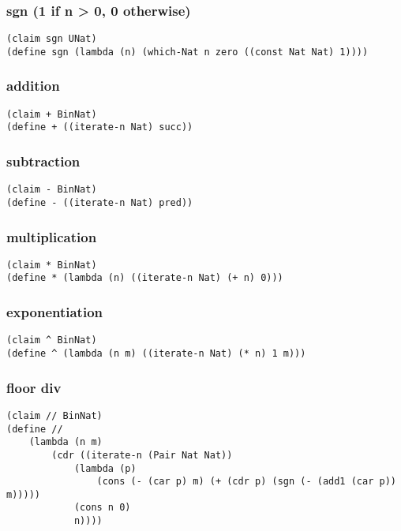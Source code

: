 \subsubsection{sgn (1 if n > 0, 0 otherwise)}
\begin{verbatim}
(claim sgn UNat)
(define sgn (lambda (n) (which-Nat n zero ((const Nat Nat) 1))))
\end{verbatim}

\subsubsection{addition}
\begin{verbatim}
(claim + BinNat)
(define + ((iterate-n Nat) succ))
\end{verbatim}

\subsubsection{subtraction}
\begin{verbatim}
(claim - BinNat)
(define - ((iterate-n Nat) pred))
\end{verbatim}

\subsubsection{multiplication}
\begin{verbatim}
(claim * BinNat)
(define * (lambda (n) ((iterate-n Nat) (+ n) 0)))
\end{verbatim}

\subsubsection{exponentiation}
\begin{verbatim}
(claim ^ BinNat)
(define ^ (lambda (n m) ((iterate-n Nat) (* n) 1 m)))
\end{verbatim}

\subsubsection{floor div}
\begin{verbatim}
(claim // BinNat)
(define //
    (lambda (n m)
        (cdr ((iterate-n (Pair Nat Nat)) 
            (lambda (p)
                (cons (- (car p) m) (+ (cdr p) (sgn (- (add1 (car p)) m))))) 
            (cons n 0)
            n))))
\end{verbatim}


